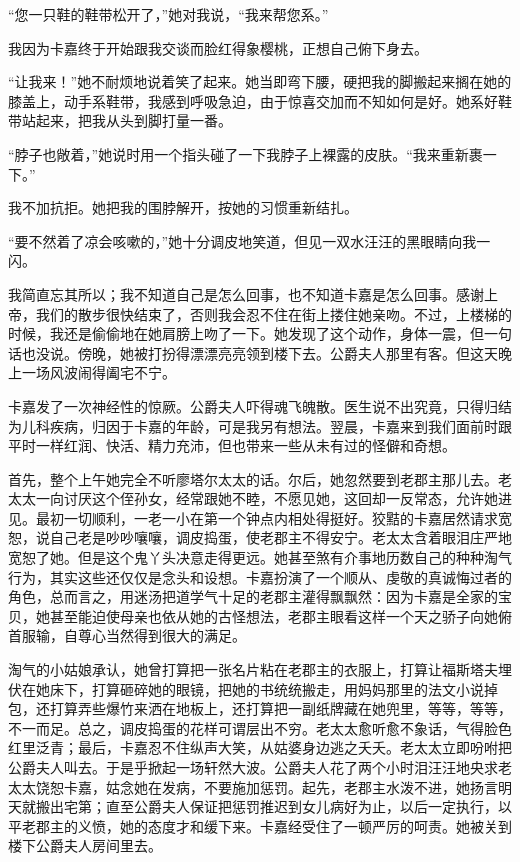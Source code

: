 \documentclass[12pt, UTF8]{ctexbook}
\begin{document}
\par “您一只鞋的鞋带松开了，”她对我说，“我来帮您系。”
\par 我因为卡嘉终于开始跟我交谈而脸红得象樱桃，正想自己俯下身去。
\par “让我来！”她不耐烦地说着笑了起来。她当即弯下腰，硬把我的脚搬起来搁在她的膝盖上，动手系鞋带，我感到呼吸急迫，由于惊喜交加而不知如何是好。她系好鞋带站起来，把我从头到脚打量一番。
\par “脖子也敞着，”她说时用一个指头碰了一下我脖子上裸露的皮肤。“我来重新裹一下。”
\par 我不加抗拒。她把我的围脖解开，按她的习惯重新结扎。
\par “要不然着了凉会咳嗽的，”她十分调皮地笑道，但见一双水汪汪的黑眼睛向我一闪。
\par 我简直忘其所以；我不知道自己是怎么回事，也不知道卡嘉是怎么回事。感谢上帝，我们的散步很快结束了，否则我会忍不住在街上搂住她亲吻。不过，上楼梯的时候，我还是偷偷地在她肩膀上吻了一下。她发现了这个动作，身体一震，但一句话也没说。傍晚，她被打扮得漂漂亮亮领到楼下去。公爵夫人那里有客。但这天晚上一场风波闹得阖宅不宁。
\par 卡嘉发了一次神经性的惊厥。公爵夫人吓得魂飞魄散。医生说不出究竟，只得归结为儿科疾病，归因于卡嘉的年龄，可是我另有想法。翌晨，卡嘉来到我们面前时跟平时一样红润、快活、精力充沛，但也带来一些从未有过的怪僻和奇想。
\par 首先，整个上午她完全不听廖塔尔太太的话。尔后，她忽然要到老郡主那儿去。老太太一向讨厌这个侄孙女，经常跟她不睦，不愿见她，这回却一反常态，允许她进见。最初一切顺利，一老一小在第一个钟点内相处得挺好。狡黠的卡嘉居然请求宽恕，说自己老是吵吵嚷嚷，调皮捣蛋，使老郡主不得安宁。老太太含着眼泪庄严地宽恕了她。但是这个鬼丫头决意走得更远。她甚至煞有介事地历数自己的种种淘气行为，其实这些还仅仅是念头和设想。卡嘉扮演了一个顺从、虔敬的真诚悔过者的角色，总而言之，用迷汤把道学气十足的老郡主灌得飘飘然：因为卡嘉是全家的宝贝，她甚至能迫使母亲也依从她的古怪想法，老郡主眼看这样一个天之骄子向她俯首服输，自尊心当然得到很大的满足。
\par 淘气的小姑娘承认，她曾打算把一张名片粘在老郡主的衣服上，打算让福斯塔夫埋伏在她床下，打算砸碎她的眼镜，把她的书统统搬走，用妈妈那里的法文小说掉包，还打算弄些爆竹来洒在地板上，还打算把一副纸牌藏在她兜里，等等，等等，不一而足。总之，调皮捣蛋的花样可谓层出不穷。老太太愈听愈不象话，气得脸色红里泛青；最后，卡嘉忍不住纵声大笑，从姑婆身边逃之夭夭。老太太立即吩咐把公爵夫人叫去。于是乎掀起一场轩然大波。公爵夫人花了两个小时泪汪汪地央求老太太饶恕卡嘉，姑念她在发病，不要施加惩罚。起先，老郡主水泼不进，她扬言明天就搬出宅第；直至公爵夫人保证把惩罚推迟到女儿病好为止，以后一定执行，以平老郡主的义愤，她的态度才和缓下来。卡嘉经受住了一顿严厉的呵责。她被关到楼下公爵夫人房间里去。
\end{document}
